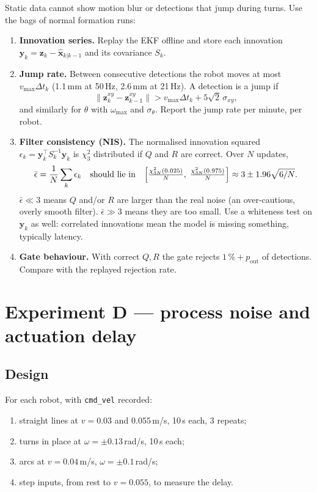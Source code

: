 \documentclass[11pt,a4paper]{article}
\begin{document}
Static data cannot show motion blur or detections that jump during
turns. Use the bags of normal formation runs:
\begin{enumerate}[leftmargin=*]
\item \textbf{Innovation series.} Replay the EKF offline and store each
      innovation $\bm{y}_k=\bm{z}_k-\hat{\bm{x}}_{k|k-1}$ and its covariance $S_k$.
\item \textbf{Jump rate.} Between consecutive detections the robot moves at most
      $v_\text{max}\Delta t_k$ (1.1\,mm at 50\,Hz, 2.6\,mm at 21\,Hz). A
      detection is a jump if
      \begin{equation}
        \|\bm{z}_{k}^{xy}-\bm{z}_{k-1}^{xy}\| > v_\text{max}\Delta t_k + 5\sqrt{2}\,\sigma_{xy},
      \end{equation}
      and similarly for $\theta$ with $\omega_\text{max}$ and $\sigma_\theta$.
      Report the jump rate per minute, per robot.
\item \textbf{Filter consistency (NIS).} The normalised innovation squared
      $\epsilon_k=\bm{y}_k^\top S_k^{-1}\bm{y}_k$ is $\chi^2_3$ distributed
      if $Q$ and $R$ are correct. Over $N$ updates,
      \begin{equation}
        \bar\epsilon=\frac1N\sum_k\epsilon_k\quad\text{should lie in}\quad
        \Bigl[\tfrac{\chi^2_{3N}(0.025)}{N},\;\tfrac{\chi^2_{3N}(0.975)}{N}\Bigr]\approx 3\pm 1.96\sqrt{6/N}.
      \end{equation}
      $\bar\epsilon\ll3$ means $Q$ and/or $R$ are larger than the real
      noise (an over-cautious, overly smooth filter). $\bar\epsilon\gg3$ means
      they are too small. Use a whiteness test on $\bm{y}_k$ as well:
      correlated innovations mean the model is missing something,
      typically latency.
\item \textbf{Gate behaviour.} With correct $Q,R$ the gate rejects
      $1\,\%+p_\text{out}$ of detections. Compare with the replayed
      rejection rate.
\end{enumerate}

\section{Experiment D --- process noise and actuation delay}
\label{sec:proc}

\subsection{Design}
For each robot, with \texttt{cmd\_vel} recorded:
\begin{enumerate}[leftmargin=*]
\item straight lines at $v=0.03$ and $0.055$\,m/s, 10\,s each, 3 repeats;
\item turns in place at $\omega=\pm0.13$\,rad/s, 10\,s each;
\item arcs at $v=0.04$\,m/s, $\omega=\pm0.1$\,rad/s;
\item step inputs, from rest to $v=0.055$, to measure the delay.
\end{enumerate}
\end{document}
